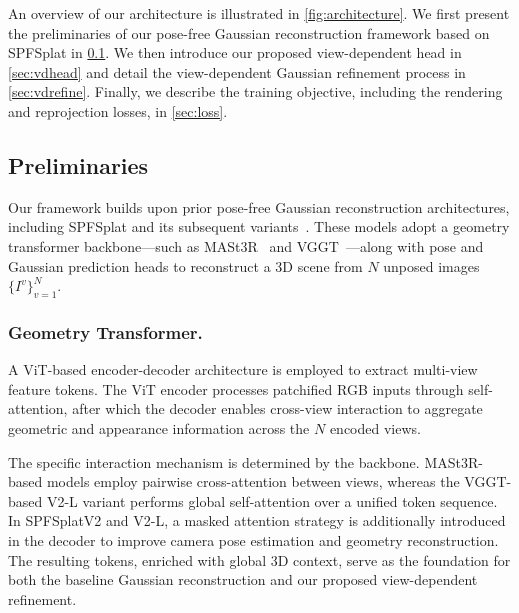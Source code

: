\documentclass[runningheads]{llncs}
\begin{document}
An overview of our architecture is illustrated in \cref{fig:architecture}. We first present the preliminaries of our pose-free Gaussian reconstruction framework based on SPFSplat \cite{huang2025spfsplat,huang2025spfsplatv2} in \cref{sec:preliminaries}. We then introduce our proposed view-dependent head in \cref{sec:vdhead} and detail the view-dependent Gaussian refinement process in \cref{sec:vdrefine}. Finally, we describe the training objective, including the rendering and reprojection losses, in \cref{sec:loss}.

\subsection{Preliminaries}
\label{sec:preliminaries}
Our framework builds upon prior pose-free Gaussian reconstruction architectures, including SPFSplat and its subsequent variants~\cite{huang2025spfsplat,huang2025spfsplatv2}. These models adopt a geometry transformer backbone---such as MASt3R~\cite{leroy2024mast3r} and VGGT~\cite{wang2025vggt}---along with pose and Gaussian prediction heads to reconstruct a 3D scene from $N$ unposed images $\{I^v\}_{v=1}^N$.

\subsubsection{Geometry Transformer.}
A ViT-based \cite{dosovitskiy2021vit} encoder-decoder architecture is employed to extract multi-view feature tokens. The ViT encoder processes patchified RGB inputs through self-attention, after which the decoder enables cross-view interaction to aggregate geometric and appearance information across the $N$ encoded views.

The specific interaction mechanism is determined by the backbone. MASt3R-based models employ pairwise cross-attention between views, whereas the VGGT-based V2-L variant performs global self-attention over a unified token sequence. In SPFSplatV2 and V2-L, a masked attention strategy is additionally introduced in the decoder to improve camera pose estimation and geometry reconstruction. The resulting tokens, enriched with global 3D context, serve as the foundation for both the baseline Gaussian reconstruction and our proposed view-dependent refinement.
\end{document}
